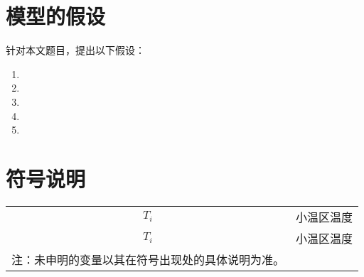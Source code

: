 \newpage%
\section{模型的假设}
针对本文题目，提出以下假设：
\begin{enumerate}
	\item 
	\item 
	\item 
	\item 
	\item
\end{enumerate}

\section{符号说明}
\begin{center}%
	\begin{tabular}{cc}
		\toprule[1pt] 
		\makebox[0.15\textwidth][c]{符号} & \makebox[0.4\textwidth][c]{说明} \\  
		\hline
		$T_i$&小温区温度\\
		$T_i$&小温区温度\\    
		\bottomrule[1pt]
		注：未申明的变量以其在符号出现处的具体说明为准。
	\end{tabular}
\end{center}


